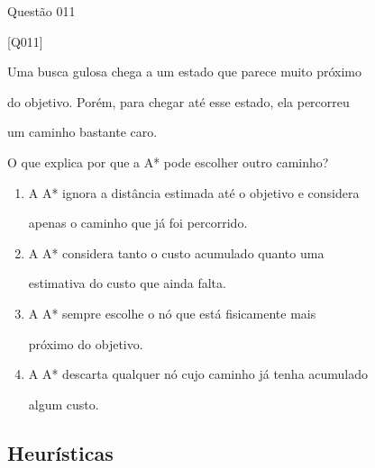 \documentclass[xcolor=dvipsnames,table]{beamer}
\begin{document}
\begin{frame}{Questão 011}

    \small

    \begin{block}{[Q011]}

        Uma busca gulosa chega a um estado que parece muito próximo

        do objetivo. Porém, para chegar até esse estado, ela percorreu

        um caminho bastante caro.

        O que explica por que a A* pode escolher outro caminho?

    \end{block}

    \begin{enumerate}[label=(\Alph*)]

        \item A A* ignora a distância estimada até o objetivo e considera

        apenas o caminho que já foi percorrido.

        \item A A* considera tanto o custo acumulado quanto uma

        estimativa do custo que ainda falta.

        \item A A* sempre escolhe o nó que está fisicamente mais

        próximo do objetivo.

        \item A A* descarta qualquer nó cujo caminho já tenha acumulado

        algum custo.

    \end{enumerate}

\end{frame}

\subsection{Heurísticas}
\end{document}
